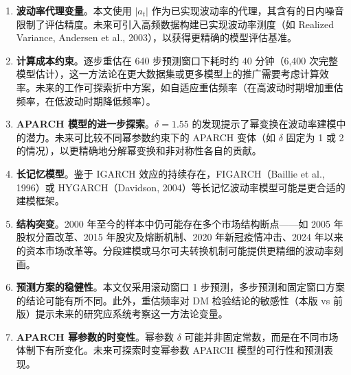 \documentclass[12pt,a4paper]{article}
\begin{document}
\begin{enumerate}[nosep,label=(\arabic*)]
    \item \textbf{波动率代理变量}。本文使用 $|a_t|$ 作为已实现波动率的代理，其含有的日内噪音限制了评估精度。未来可引入高频数据构建已实现波动率测度（如 Realized Variance, Andersen et al., 2003），以获得更精确的模型评估基准。

    \item \textbf{计算成本约束}。逐步重估在 640 步预测窗口下耗时约 40 分钟（6{,}400 次完整模型估计），这一方法论在更大数据集或更多模型上的推广需要考虑计算效率。未来的工作可探索折中方案，如自适应重估频率（在高波动时期增加重估频率，在低波动时期降低频率）。

    \item \textbf{APARCH 模型的进一步探索}。$\delta = 1.55$ 的发现提示了幂变换在波动率建模中的潜力。未来可比较不同幂参数约束下的 APARCH 变体（如 $\delta$ 固定为 1 或 2 的情况），以更精确地分解幂变换和非对称性各自的贡献。

    \item \textbf{长记忆模型}。鉴于 IGARCH 效应的持续存在，FIGARCH（Baillie et al., 1996）或 HYGARCH（Davidson, 2004）等长记忆波动率模型可能是更合适的建模框架。

    \item \textbf{结构突变}。2000 年至今的样本中仍可能存在多个市场结构断点——如 2005 年股权分置改革、2015 年股灾及熔断机制、2020 年新冠疫情冲击、2024 年以来的资本市场改革等。分段建模或马尔可夫转换机制可能提供更精细的波动率刻画。

    \item \textbf{预测方案的稳健性}。本文仅采用滚动窗口 1 步预测，多步预测和固定窗口方案的结论可能有所不同。此外，重估频率对 DM 检验结论的敏感性（本版 vs 前版）提示未来的研究应系统考察这一方法论变量。

    \item \textbf{APARCH 幂参数的时变性}。幂参数 $\delta$ 可能并非固定常数，而是在不同市场体制下有所变化。未来可探索时变幂参数 APARCH 模型的可行性和预测表现。
\end{enumerate}
\end{document}
